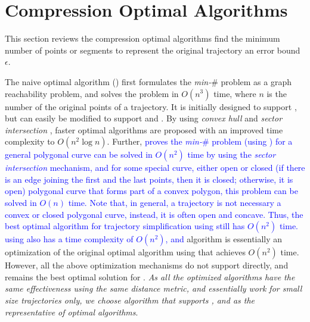 \section{Compression Optimal Algorithms}
\label{sec-optimal}

This section reviews the compression optimal \lsa algorithms find the minimum number of points or segments to represent the original trajectory \wrt an error bound $\epsilon$.

The naive optimal algorithm (\opt) \cite{Imai:Optimal} first formulates the \emph{min-$\#$} problem as a graph reachability problem, and solves the problem in  $O(n^3)$ time, where $n$ is the number of the original points of a trajectory. It is initially designed to support \ped, but can easily be modified to support \sed and \dad.
By using \textit{convex hull} \cite{Toussaint:Optimal} and \textit{sector intersection} \cite{Melkman:Optimal}, faster optimal algorithms are proposed with an improved time complexity to $O(n^2 \log n)$. Further, \cite{Chan:Optimal} \textcolor{blue}{proves the \emph{min-$\#$} problem (using \ped) for a general polygonal curve can be solved in $O(n^2)$ time by using the \textit{sector intersection} mechanism, and for some special curve, either open or closed (if there is an edge joining the first and the last points, then it is closed; otherwise, it is open) polygonal curve that forms part of a convex polygon, this problem can be solved in $O(n)$ time. Note that, in general, a trajectory is not necessary a convex or closed polygonal curve, instead, it is often open and concave. Thus, the best optimal algorithm for trajectory simplification using \ped still has $O(n^2)$ time.} 
%
\textcolor{blue}{\optss~\cite{Chen:Fast} using \lissed also has a time complexity of $O(n^2)$, and}
%
algorithm  \cite{Long:Direction} is essentially an optimization of the original optimal algorithm using \dad that achieves $O(n^2)$ time. 
%
However, all the above optimization mechanisms do not support \sed directly, and \opt remains the best optimal solution for \sed . {\em As all the optimized algorithms have the same effectiveness using the same distance metric, and essentially work for small size trajectories only, we choose algorithm \opt that supports \ped, \sed and \dad as the representative of optimal \lsa algorithms}.



